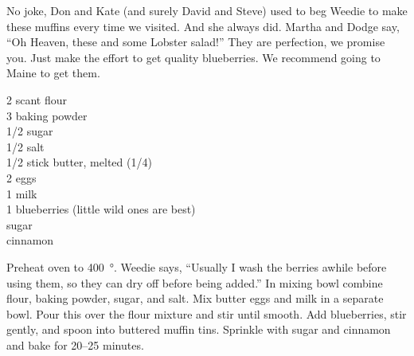 \begin{open}
  No joke, Don and Kate (and surely David and Steve) used to beg Weedie
  to make these muffins every time we visited. And she always did. Martha and
  Dodge say, ``Oh Heaven, these and some Lobster salad!'' They are perfection,
  we promise you. Just make the effort to get quality blueberries. We
  recommend going to Maine to get them.
\end{open}
\begin{ingredients}
  2 scant \si{\cup} flour\\
  \SI{3}{\teaspoon} baking powder\\
  \SI{1/2}{\cup} sugar\\
  \SI{1/2}{\teaspoon} salt\\
  \num{1/2} stick butter, melted (\SI{1/4}{\cup})\\
  2 eggs\\
  \SI{1}{\cup} milk\\
  \SI{1}{\cup} blueberries (little wild ones are best)\\
  sugar\\
  cinnamon
\end{ingredients}
Preheat oven to \SI{400}{\degree}. Weedie says, ``Usually I wash the berries
awhile before using them, so they can dry off before being added.'' In mixing
bowl combine flour, baking powder, sugar, and salt. Mix butter eggs and milk
in a separate bowl. Pour this over the flour mixture and stir until
smooth. Add blueberries, stir gently, and spoon into buttered muffin
tins. Sprinkle with sugar and cinnamon and bake for \numrange{20}{25} minutes.
